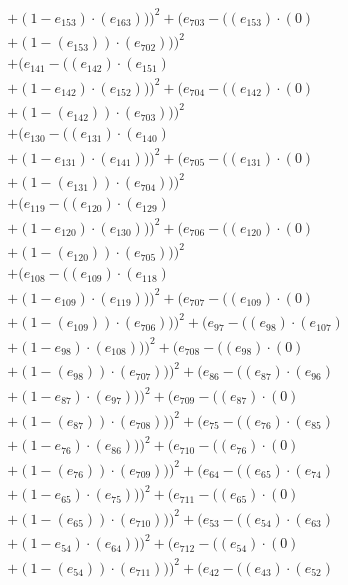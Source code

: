 \documentclass[10pt, a4paper]{article}
\begin{document}
\begin{small}
\begin{align*}
& + (1 - e_{153})  \cdot  (e_{163})))^{2} + (e_{703} - ((e_{153}) \cdot (0) \\
& + (1 - (e_{153})) \cdot (e_{702})))^{2} \\
& + (e_{141} - ((e_{142})  \cdot  (e_{151}) \\
& + (1 - e_{142})  \cdot  (e_{152})))^{2} + (e_{704} - ((e_{142}) \cdot (0) \\
& + (1 - (e_{142})) \cdot (e_{703})))^{2} \\
& + (e_{130} - ((e_{131})  \cdot  (e_{140}) \\
& + (1 - e_{131})  \cdot  (e_{141})))^{2} + (e_{705} - ((e_{131}) \cdot (0) \\
& + (1 - (e_{131})) \cdot (e_{704})))^{2} \\
& + (e_{119} - ((e_{120})  \cdot  (e_{129}) \\
& + (1 - e_{120})  \cdot  (e_{130})))^{2} + (e_{706} - ((e_{120}) \cdot (0) \\
& + (1 - (e_{120})) \cdot (e_{705})))^{2} \\
& + (e_{108} - ((e_{109})  \cdot  (e_{118}) \\
& + (1 - e_{109})  \cdot  (e_{119})))^{2} + (e_{707} - ((e_{109}) \cdot (0) \\
& + (1 - (e_{109})) \cdot (e_{706})))^{2} + (e_{97} - ((e_{98})  \cdot  (e_{107}) \\
& + (1 - e_{98})  \cdot  (e_{108})))^{2} + (e_{708} - ((e_{98}) \cdot (0) \\
& + (1 - (e_{98})) \cdot (e_{707})))^{2} + (e_{86} - ((e_{87})  \cdot  (e_{96}) \\
& + (1 - e_{87})  \cdot  (e_{97})))^{2} + (e_{709} - ((e_{87}) \cdot (0) \\
& + (1 - (e_{87})) \cdot (e_{708})))^{2} + (e_{75} - ((e_{76})  \cdot  (e_{85}) \\
& + (1 - e_{76})  \cdot  (e_{86})))^{2} + (e_{710} - ((e_{76}) \cdot (0) \\
& + (1 - (e_{76})) \cdot (e_{709})))^{2} + (e_{64} - ((e_{65})  \cdot  (e_{74}) \\
& + (1 - e_{65})  \cdot  (e_{75})))^{2} + (e_{711} - ((e_{65}) \cdot (0) \\
& + (1 - (e_{65})) \cdot (e_{710})))^{2} + (e_{53} - ((e_{54})  \cdot  (e_{63}) \\
& + (1 - e_{54})  \cdot  (e_{64})))^{2} + (e_{712} - ((e_{54}) \cdot (0) \\
& + (1 - (e_{54})) \cdot (e_{711})))^{2} + (e_{42} - ((e_{43})  \cdot  (e_{52}) \\

\end{align*}
\end{small}
\end{document}
